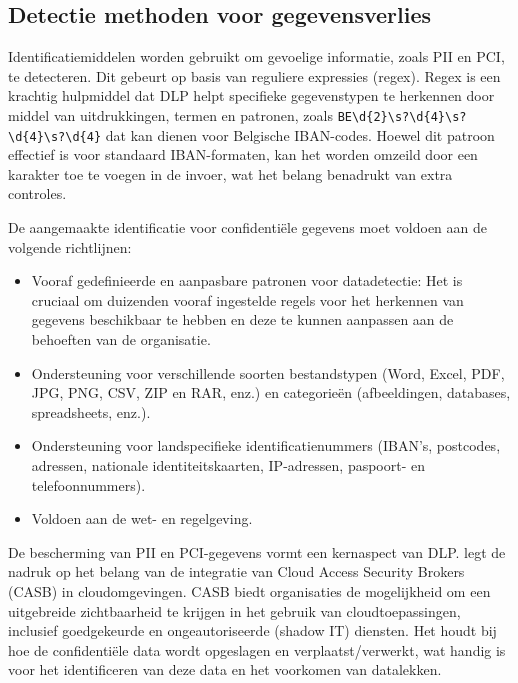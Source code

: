 \subsection{Detectie methoden voor gegevensverlies}

Identificatiemiddelen worden gebruikt om gevoelige informatie, zoals PII en PCI, te detecteren. 
Dit gebeurt op basis van reguliere expressies (regex). 
Regex is een krachtig hulpmiddel dat DLP helpt specifieke gegevenstypen te herkennen door middel van uitdrukkingen, termen en patronen, 
zoals \texttt{BE\textbackslash d\{2\}\textbackslash s?\textbackslash d\{4\}\textbackslash s?\textbackslash d\{4\}\-\textbackslash s?\textbackslash d\{4\}} 
dat kan dienen voor Belgische IBAN-codes. 
Hoewel dit patroon effectief is voor standaard IBAN-formaten, 
kan het worden omzeild door een karakter toe te voegen in de invoer, wat het belang benadrukt van extra controles. 

De aangemaakte identificatie voor confidentiële gegevens moet voldoen aan de volgende richtlijnen:

\begin{itemize}
    \item Vooraf gedefinieerde en aanpasbare patronen voor datadetectie: Het is cruciaal om duizenden vooraf ingestelde regels voor het herkennen van gegevens beschikbaar te hebben en deze te kunnen aanpassen aan de behoeften van de organisatie.
    \item Ondersteuning voor verschillende soorten bestandstypen (Word, Excel, PDF, JPG, PNG, CSV, ZIP en RAR, enz.) en categorieën (afbeeldingen, databases, spreadsheets, enz.).
    \item Ondersteuning voor landspecifieke identificatienummers (IBAN's, postcodes, adressen, nationale identiteitskaarten, IP-adressen, pas\-poort- en telefoonnummers).
    \item Voldoen aan de wet- en regelgeving.
\end{itemize}

De bescherming van PII en PCI-gegevens vormt een kernaspect van DLP. \textcite{Wason2020CASB} legt de nadruk op het belang van de integratie van Cloud Access Security Brokers (CASB) in cloudomgevingen. 
CASB biedt organisaties de mogelijkheid om een uitgebreide zichtbaarheid te krijgen in het gebruik van cloudtoepassingen, inclusief goedgekeurde en ongeautoriseerde (shadow IT) diensten. 
Het houdt bij hoe de confidentiële data wordt opgeslagen en verplaatst/verwerkt, wat handig is voor het identificeren van deze data en het voorkomen van datalekken.

